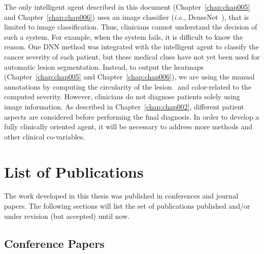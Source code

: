 The only intelligent agent described in this document (Chapter~\ref{chap:chap005} and Chapter~\ref{chap:chap006}) uses an image classifier ({\it i.e.}, DenseNet~\cite{Huang_2017_CVPR}), that is limited to image classification.
Thus, clinicians cannot understand the decision of such a system.
For example, when the system fails, it is difficult to know the reason.
One \ac{DNN} method was integrated with the intelligent agent to classify the cancer severity of each patient, but these medical clues have not yet been used for automatic lesion segmentation.
Instead, to output the heatmaps (Chapter~\ref{chap:chap005} and Chapter~\ref{chap:chap006}), we are using the manual annotations by computing the circularity of the lesion~\cite{DALILA2017749} and color-related to the computed severity.
However, clinicians do not diagnose patients solely using image information.
As described in Chapter~\ref{chap:chap002}, different patient aspects are considered before performing the final diagnosis.
In order to develop a fully clinically oriented agent, it will be necessary to address more methods and other clinical co-variables.

\clearpage

\section{List of Publications}
\label{sec:chap001006}

The work developed in this thesis was published in conferences and journal papers. The following sections will list the set of publications published and/or under revision (but accepted) until now.

\subsection{Conference Papers}
\label{sec:chap00100601}

